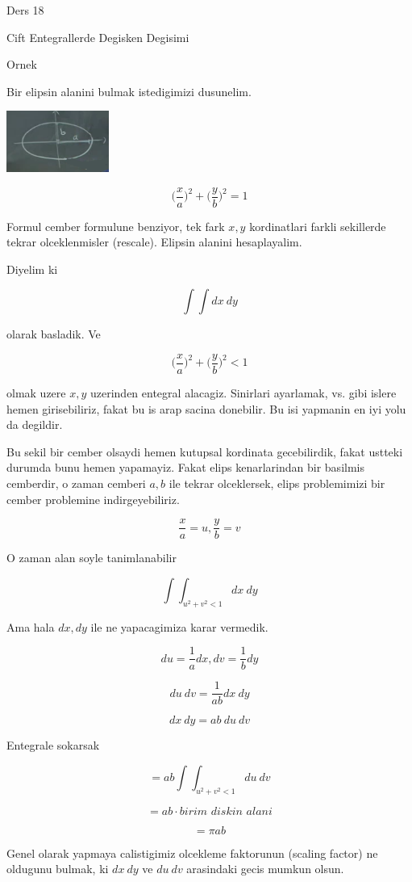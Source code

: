 \documentclass[12pt,fleqn]{article}
\begin{document}
Ders 18

Cift Entegrallerde Degisken Degisimi 

Ornek 

Bir elipsin alanini bulmak istedigimizi dusunelim. 

\includegraphics[height=2cm]{18_1.png}

\[ \bigg(\frac{x}{a}\bigg)^2 + \bigg(\frac{y}{b}\bigg)^2 = 1 \]

Formul cember formulune benziyor, tek fark $x,y$ kordinatlari farkli
sekillerde tekrar olceklenmisler (rescale). Elipsin alanini hesaplayalim. 

Diyelim ki 

\[ \int \int dx \ dy \]

olarak basladik. Ve

\[ \bigg(\frac{x}{a}\bigg)^2 + \bigg(\frac{y}{b}\bigg)^2 < 1 \]

olmak uzere $x,y$ uzerinden entegral alacagiz. Sinirlari ayarlamak,
vs. gibi islere hemen girisebiliriz, fakat bu is arap sacina donebilir. Bu
isi yapmanin en iyi yolu da degildir. 

Bu sekil bir cember olsaydi hemen kutupsal kordinata gecebilirdik, fakat
ustteki durumda bunu hemen yapamayiz. Fakat elips kenarlarindan bir basilmis
cemberdir, o zaman cemberi $a,b$ ile tekrar olceklersek, elips problemimizi
bir cember problemine indirgeyebiliriz. 

\[ \frac{x}{a} = u, \frac{y}{b} = v \]

O zaman alan soyle tanimlanabilir 

\[ \int \int_{u^2 + v^2 < 1} dx \ dy \]

Ama hala $dx,dy$ ile ne yapacagimiza karar vermedik. 

\[ du = \frac{1}{a}dx,dv = \frac{1}{b}dy \]

\[ du \ dv = \frac{1}{ab}dx \ dy \]

\[ dx \ dy = ab \ du \ dv \]

Entegrale sokarsak

\[ = ab \int \int_{u^2 + v^2 < 1} du \ dv \]

\[ = ab \cdot \textit{birim diskin alani} \]

\[ = \pi ab \]

Genel olarak yapmaya calistigimiz olcekleme faktorunun (scaling factor) ne
oldugunu bulmak, ki $dx \ dy$ ve $du \ dv$ arasindaki gecis mumkun olsun. 
\end{document}
